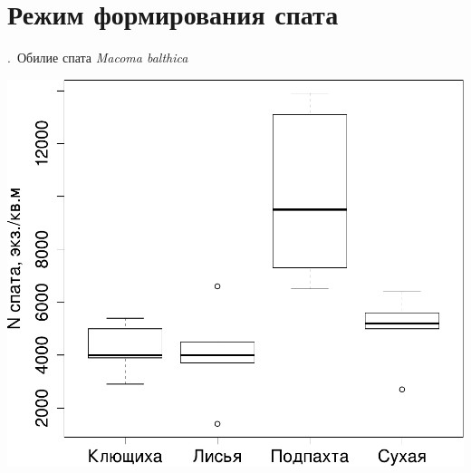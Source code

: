 \documentclass[aspectratio=169, xcolor=table]{beamer}
\begin{document}


		\section[Оседание]{Режим формирования спата}
\begin{frame}{\insertpagenumber.\ Обилие спата \textit{Macoma balthica}}
		\begin{center}
			\includegraphics[height=.8\textheight]{N_spat1.pdf}
		\end{center}
\end{frame}
\end{document}
